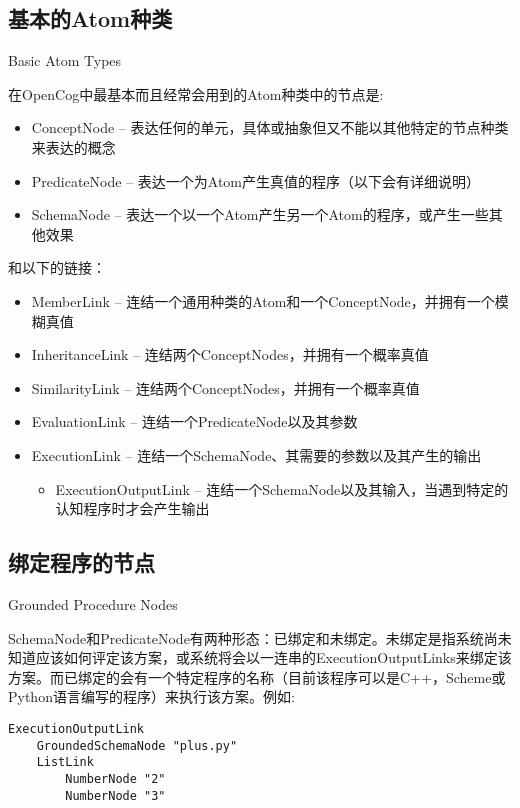 \subsection{基本的Atom种类}{Basic Atom Types}

在OpenCog中最基本而且经常会用到的Atom种类中的节点是:

\begin{itemize}
\item ConceptNode -- 表达任何的单元，具体或抽象但又不能以其他特定的节点种类来表达的概念
\item PredicateNode  -- 表达一个为Atom产生真值的程序（以下会有详细说明）
\item SchemaNode -- 表达一个以一个Atom产生另一个Atom的程序，或产生一些其他效果
\end{itemize}

和以下的链接：

\begin{itemize}
\item MemberLink -- 连结一个通用种类的Atom和一个ConceptNode，并拥有一个模糊真值
\item InheritanceLink -- 连结两个ConceptNodes，并拥有一个概率真值
\item SimilarityLink -- 连结两个ConceptNodes，并拥有一个概率真值
\item EvaluationLink -- 连结一个PredicateNode以及其参数
\item ExecutionLink -- 连结一个SchemaNode、其需要的参数以及其产生的输出
\begin{itemize}
\item ExecutionOutputLink -- 连结一个SchemaNode以及其输入，当遇到特定的认知程序时才会产生输出
\end{itemize}
\end{itemize}


\subsection{绑定程序的节点}{Grounded Procedure Nodes}

SchemaNode和PredicateNode有两种形态：已绑定和未绑定。未绑定是指系统尚未知道应该如何评定该方案，或系统将会以一连串的ExecutionOutputLinks来绑定该方案。而已绑定的会有一个特定程序的名称（目前该程序可以是C++，Scheme或Python语言编写的程序）来执行该方案。例如:

\begin{verbatim}
ExecutionOutputLink
	GroundedSchemaNode "plus.py"
	ListLink
		NumberNode "2"
		NumberNode "3"
\end{verbatim}

